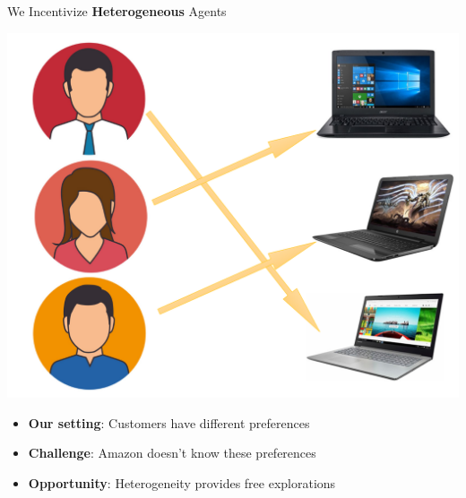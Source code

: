 \documentclass[serif]{beamer}
\begin{document}
\begin{frame}{We Incentivize \textbf{Heterogeneous} Agents}
\begin{center}
\includegraphics[scale=0.30]{example2}
\end{center}
\begin{itemize}[label=\textbullet]
\item \textbf{Our setting}: Customers have different preferences
\item \textbf{Challenge}: Amazon doesn't know these preferences
\item \textbf{Opportunity}: Heterogeneity provides free explorations
\end{itemize}
\end{frame}




%

\end{document}
